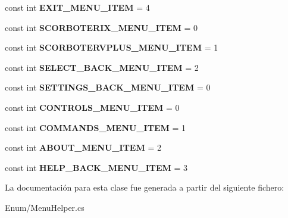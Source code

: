 \begin{DoxyCompactItemize}
const int {\bfseries E\+X\+I\+T\+\_\+\+M\+E\+N\+U\+\_\+\+I\+T\+EM} = 4
\item 
\mbox{\label{class_menu_helper_a9cdf00a5033edc3faadc401b94ad57ff}} 
const int {\bfseries S\+C\+O\+R\+B\+O\+T\+E\+R\+I\+X\+\_\+\+M\+E\+N\+U\+\_\+\+I\+T\+EM} = 0
\item 
\mbox{\label{class_menu_helper_add5a38fb0a7ae99b912b979dad0a3d17}} 
const int {\bfseries S\+C\+O\+R\+B\+O\+T\+E\+R\+V\+P\+L\+U\+S\+\_\+\+M\+E\+N\+U\+\_\+\+I\+T\+EM} = 1
\item 
\mbox{\label{class_menu_helper_aadf82db07fdf0fe9a664a16a45ded128}} 
const int {\bfseries S\+E\+L\+E\+C\+T\+\_\+\+B\+A\+C\+K\+\_\+\+M\+E\+N\+U\+\_\+\+I\+T\+EM} = 2
\item 
\mbox{\label{class_menu_helper_ac079a1f17aee9f56c3c634a1aa5959d0}} 
const int {\bfseries S\+E\+T\+T\+I\+N\+G\+S\+\_\+\+B\+A\+C\+K\+\_\+\+M\+E\+N\+U\+\_\+\+I\+T\+EM} = 0
\item 
\mbox{\label{class_menu_helper_a17d0144189f15504d1bc06ff75ce9ace}} 
const int {\bfseries C\+O\+N\+T\+R\+O\+L\+S\+\_\+\+M\+E\+N\+U\+\_\+\+I\+T\+EM} = 0
\item 
\mbox{\label{class_menu_helper_a86ea0eaa15b1676068d97d306a35702d}} 
const int {\bfseries C\+O\+M\+M\+A\+N\+D\+S\+\_\+\+M\+E\+N\+U\+\_\+\+I\+T\+EM} = 1
\item 
\mbox{\label{class_menu_helper_a5b397dee129b11d62e407bfd40ca0734}} 
const int {\bfseries A\+B\+O\+U\+T\+\_\+\+M\+E\+N\+U\+\_\+\+I\+T\+EM} = 2
\item 
\mbox{\label{class_menu_helper_ad8b54c181ecbc25184317a12e7ee8969}} 
const int {\bfseries H\+E\+L\+P\+\_\+\+B\+A\+C\+K\+\_\+\+M\+E\+N\+U\+\_\+\+I\+T\+EM} = 3
\end{DoxyCompactItemize}


La documentación para esta clase fue generada a partir del siguiente fichero\+:\begin{DoxyCompactItemize}
\item 
Enum/Menu\+Helper.\+cs\end{DoxyCompactItemize}
